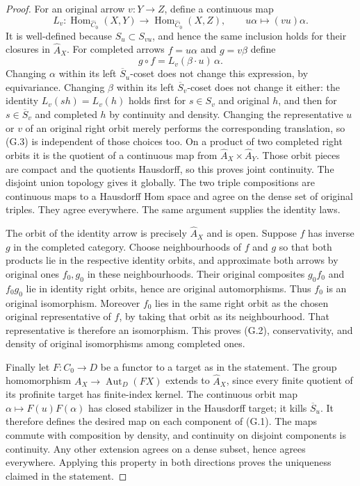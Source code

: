 \begin{proof}
For an original arrow $v:Y\to Z$, define a continuous map
\[
 L_v:\operatorname{Hom}_{\widehat C_0}(X,Y)
 \longrightarrow\operatorname{Hom}_{\widehat C_0}(X,Z),
 \qquad u\alpha\longmapsto(vu)\alpha .
\]
It is well-defined because $S_u\subset S_{vu}$, and hence the same
inclusion holds for their closures in $\widehat A_X$. For completed
arrows $f=u\alpha$ and $g=v\beta$ define
\[
             g\circ f=L_v(\beta\cdot u)\,\alpha.           \tag{G.3}
\]
Changing $\alpha$ within its left $\overline S_u$-coset does not change
this expression, by equivariance. Changing $\beta$ within its left
$\overline S_v$-coset does not change it either: the identity
$L_v(s h)=L_v(h)$ holds first for $s\in S_v$ and original $h$, and
then for $s\in\overline S_v$ and completed $h$ by continuity and
density. Changing the representative $u$ or $v$ of an original right
orbit merely performs the corresponding translation, so (G.3) is
independent of those choices too. On a product of two completed right
orbits it is the quotient of a continuous map from
$\widehat A_X\times\widehat A_Y$. Those orbit pieces are compact and
the quotients Hausdorff, so this proves joint continuity. The disjoint
union topology gives it globally. The two triple compositions are
continuous maps to a Hausdorff Hom space and agree on the dense set of
original triples. They agree everywhere. The same argument supplies
the identity laws.

The orbit of the identity arrow is precisely $\widehat A_X$ and is
open. Suppose $f$ has inverse $g$ in the completed category. Choose
neighbourhoods of $f$ and $g$ so that both products lie in the
respective identity orbits, and approximate both arrows by original
ones $f_0,g_0$ in these neighbourhoods. Their original composites
$g_0f_0$ and $f_0g_0$ lie in identity right orbits, hence are original
automorphisms. Thus $f_0$ is an original isomorphism. Moreover $f_0$
lies in the same right orbit as the chosen original representative
of $f$, by taking that orbit as its neighbourhood. That representative
is therefore an isomorphism. This proves (G.2), conservativity, and
density of original isomorphisms among completed ones.

Finally let $F:C_0\to D$ be a functor to a target as in the statement.
The group homomorphism $A_X\to\operatorname{Aut}_D(FX)$ extends to
$\widehat A_X$, since every finite quotient of its profinite target
has finite-index kernel. The continuous orbit map
$\alpha\mapsto F(u)F(\alpha)$ has closed stabilizer in the Hausdorff
target; it kills $\overline S_u$. It therefore defines the desired map
on each component of (G.1). The maps commute with composition by
density, and continuity on disjoint components is continuity. Any
other extension agrees on a dense subset, hence agrees everywhere.
Applying this property in both directions proves the uniqueness
claimed in the statement.
\end{proof}

